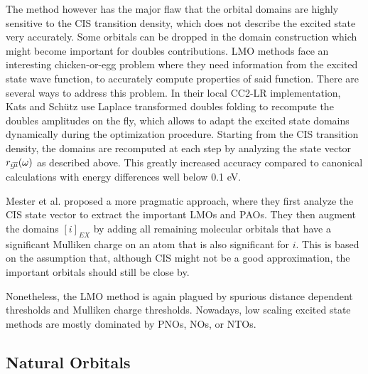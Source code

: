The method however has the major flaw that the orbital domains are highly sensitive to the CIS transition density, which does not describe the excited state very accurately. Some orbitals can be dropped in the domain construction which might become important for doubles contributions. LMO methods face an interesting chicken-or-egg problem where they need information from the excited state wave function, to accurately compute properties of said function. There are several ways to address this problem. In their local CC2-LR implementation, Kats and Schütz \cite{Kat2009} use Laplace transformed doubles folding to recompute the doubles amplitudes on the fly, which allows to adapt the excited state domains dynamically during the optimization procedure. Starting from the CIS transition density, the domains are recomputed at each step by analyzing the state vector $r_{\underline{i} \overline{\mu}}(\omega)$ as described above. This greatly increased accuracy compared to canonical calculations with energy differences well below 0.1 eV.

Mester et al. \cite{Mes2017} proposed a more pragmatic approach, where they first analyze the CIS state vector to extract the important LMOs and PAOs. They then augment the domains $[i]_{EX}$ by adding all remaining molecular orbitals that have a significant Mulliken charge on an atom that is also significant for $i$. This is based on the assumption that, although CIS might not be a good approximation, the important orbitals should still be close by. 

Nonetheless, the LMO method is again plagued by spurious distance dependent thresholds and Mulliken charge thresholds. Nowadays, low scaling excited state methods are mostly dominated by PNOs, NOs, or NTOs.


\subsection{Natural Orbitals}

